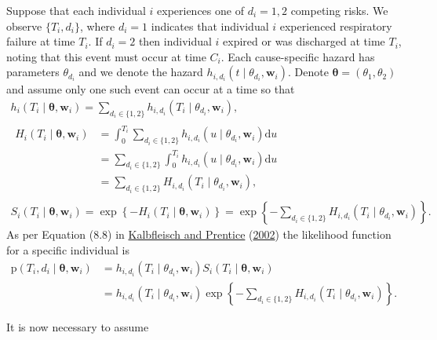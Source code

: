 \documentclass[
  10pt,
  a4paper,
]{article}
\newcommand{\pd}{\text{p}}
\begin{document}
Suppose that each individual \(i\) experiences one of \(d_{i} = 1, 2\)
competing risks. We observe \(\{T_{i}, d_{i}\}\), where \(d_{i} = 1\)
indicates that individual \(i\) experienced respiratory failure at time
\(T_{i}\). If \(d_{i} = 2\) then individual \(i\) expired or was
discharged at time \(T_{i}\), noting that this event must occur at time
\(C_{i}\). Each cause-specific hazard has parameters \(\theta_{d_{i}}\)
and we denote the hazard
\(h_{i, d_{i}}(t \mid \theta_{d_{i}}, \boldsymbol{w}_{i})\). Denote
\(\boldsymbol{\theta} = (\theta_{1}, \theta_{2})\) and assume only one
such event can occur at a time so that \begin{gather}
  h_{i}(T_{i} \mid \boldsymbol{\theta}, \boldsymbol{w}_{i}) = \sum_{d_{i} \in \{1, 2\}} h_{i, d_{i}}(T_{i} \mid \theta_{d_{i}}, \boldsymbol{w}_{i}), \\
  \begin{aligned}
  H_{i}(T_{i} \mid \boldsymbol{\theta}, \boldsymbol{w}_{i})
    &= \int_{0}^{T_{i}} \sum_{d_{i} \in \{1, 2\}} h_{i, d_{i}}(u \mid \theta_{d_{i}}, \boldsymbol{w}_{i}) \text{d}u \\
    &= \sum_{d_{i} \in \{1, 2\}} \int_{0}^{T_{i}} h_{i, d_{i}}(u \mid \theta_{d_{i}}, \boldsymbol{w}_{i}) \text{d}u \\
    &= \sum_{d_{i} \in \{1, 2\}} H_{i, d_{i}}(T_{i} \mid \theta_{d_{i}}, \boldsymbol{w}_{i}),
  \end{aligned} \\
  S_{i}(T_{i} \mid \boldsymbol{\theta}, \boldsymbol{w}_{i})
    = \exp\left\{-H_{i}(T_{i} \mid \boldsymbol{\theta}, \boldsymbol{w}_{i})\right\}
    = \exp\left\{-\sum_{d_{i} \in \{1, 2\}} H_{i, d_{i}}(T_{i} \mid \theta_{d_{i}}, \boldsymbol{w}_{i})\right\}.
\end{gather} As per Equation (8.8) in
\protect\hyperlink{ref-kalbfleisch_statistical_2002}{Kalbfleisch and
Prentice} (\protect\hyperlink{ref-kalbfleisch_statistical_2002}{2002})
the likelihood function for a specific individual is \begin{align*}
  \pd(T_{i}, d_{i} \mid \boldsymbol{\theta}, \boldsymbol{w}_{i})
    &= h_{i, d_{i}}(T_{i} \mid \theta_{d_{i}}, \boldsymbol{w}_{i}) S_{i}(T_{i} \mid \boldsymbol{\theta}, \boldsymbol{w}_{i}) \\
    &= h_{i, d_{i}}(T_{i} \mid \theta_{d_{i}}, \boldsymbol{w}_{i}) \exp\left\{-\sum_{d_{i} \in \{1, 2\}} H_{i, d_{i}}(T_{i} \mid \theta_{d_{i}}, \boldsymbol{w}_{i})\right\}.
\end{align*}

It is now necessary to assume
\end{document}
